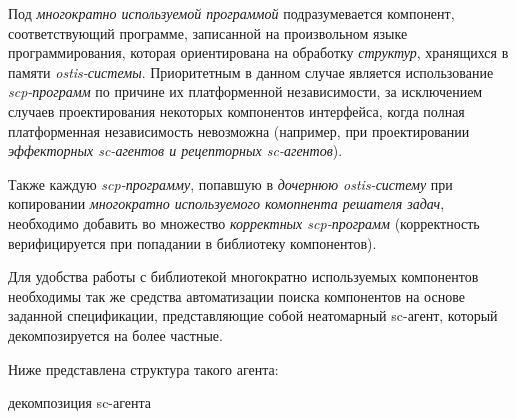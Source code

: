 Под \textit{многократно используемой программой} подразумевается компонент, соответствующий программе, записанной на произвольном языке программирования, которая ориентирована на обработку \textit{структур}, хранящихся в памяти \textit{ostis-системы}. Приоритетным в данном случае является использование \textit{scp-программ} по причине их платформенной независимости, за исключением случаев проектирования некоторых компонентов интерфейса, когда полная платформенная независимость невозможна (например, при проектировании \textit{эффекторных sc-агентов и рецепторных sc-агентов}).

Также каждую \textit{scp-программу}, попавшую в \textit{дочернюю ostis-систему} при копировании \textit{многократно используемого комопнента решателя задач}, необходимо добавить во множество \textit{корректных scp-программ} (корректность верифицируется при попадании в библиотеку компонентов).

Для удобства работы с библиотекой многократно используемых компонентов необходимы так же средства автоматизации поиска компонентов на основе заданной спецификации, представляющие собой неатомарный sc-агент, который декомпозируется на более частные.

Ниже представлена структура такого агента:

\begin{SCn}
\begin{scnreltoset}{декомпозиция sc-агента}
\end{scnreltoset}
\end{SCn}

